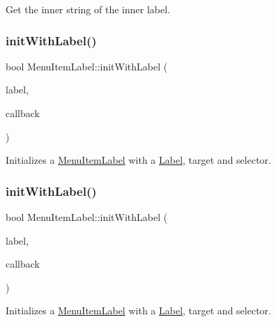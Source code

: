 Get the inner string of the inner label. \mbox{\label{classMenuItemLabel_a3ef4f4b3d962dd6777a8840f5dda0473}} 
\subsubsection{\texorpdfstring{init\+With\+Label()}{initWithLabel()}\hspace{0.1cm}{\footnotesize\ttfamily [1/4]}}
{\footnotesize\ttfamily bool Menu\+Item\+Label\+::init\+With\+Label (\begin{DoxyParamCaption}\item[{\hyperlink{classNode}{Node} $\ast$}]{label,  }\item[{const cc\+Menu\+Callback \&}]{callback }\end{DoxyParamCaption})}

Initializes a \hyperlink{classMenuItemLabel}{Menu\+Item\+Label} with a \hyperlink{classLabel}{Label}, target and selector. \mbox{\label{classMenuItemLabel_a3ef4f4b3d962dd6777a8840f5dda0473}} 
\subsubsection{\texorpdfstring{init\+With\+Label()}{initWithLabel()}\hspace{0.1cm}{\footnotesize\ttfamily [2/4]}}
{\footnotesize\ttfamily bool Menu\+Item\+Label\+::init\+With\+Label (\begin{DoxyParamCaption}\item[{\hyperlink{classNode}{Node} $\ast$}]{label,  }\item[{const cc\+Menu\+Callback \&}]{callback }\end{DoxyParamCaption})}

Initializes a \hyperlink{classMenuItemLabel}{Menu\+Item\+Label} with a \hyperlink{classLabel}{Label}, target and selector. \mbox{\label{classMenuItemLabel_a2214307d26fb27b4c559bb9389198918}} 
